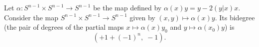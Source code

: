 Let $\alpha: S^{n-1} \times S^{n-1} \to S^{n-1}$ be the map defined by $\alpha(x)y = y - 2(y|x)x$. Consider the map $S^{n-1} \times S^{n-1} \to S^{n-1}$ given by $(x, y) \mapsto \alpha(x)y$. Its bidegree (the pair of degrees of the partial maps $x \mapsto \alpha(x)y_0$ and $y \mapsto \alpha(x_0)y$) is
$$(+1 + (-1)^n, \; -1).$$
